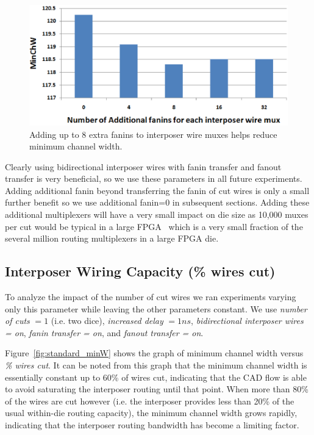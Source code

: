 \documentclass[journal]{IEEEtran}
\begin{document}
\begin{figure}[!h]
\centering
\includegraphics[width=\linewidth]{additional_fanins.eps}
\caption{Adding up to 8 extra fanins to interposer wire muxes helps reduce minimum channel width.}
\label{fig:additional_fanins}
\end{figure}

Clearly using bidirectional interposer wires with fanin transfer and fanout transfer is very beneficial, so we use these parameters in all future experiments. Adding additional fanin beyond transferring the fanin of cut wires is only a small further benefit so we use additional fanin=0 in subsequent sections. Adding these additional multiplexers will have a very small impact on die size as 10,000 muxes per cut would be typical in a large FPGA~\cite{xilinx7series} which is a very small fraction of the several million routing multiplexers in a large FPGA die.


\subsection{Interposer Wiring Capacity (\% wires cut)}
\label{sec:resultsWiringCapacity}

To analyze the impact of the number of cut wires we ran experiments varying only this parameter while leaving the other parameters constant. We use \textit{number of cuts} $= 1$ (i.e. two dice), \textit{increased delay} $= 1ns$, \textit{bidirectional interposer wires = on}, \textit{fanin transfer = on}, and \textit{fanout transfer = on}.

Figure~\ref{fig:standard_minW} shows the graph of minimum channel width versus \textit{\% wires cut}. It can be noted from this graph that the minimum channel width is essentially constant up to 60\% of wires cut, indicating that the CAD flow is able to avoid saturating the interposer routing until that point. When more than 80\% of the wires are cut however (i.e. the interposer provides less than 20\% of the usual within-die routing capacity), the minimum channel width grows rapidly, indicating that the interposer routing bandwidth has become a limiting factor.
\end{document}

